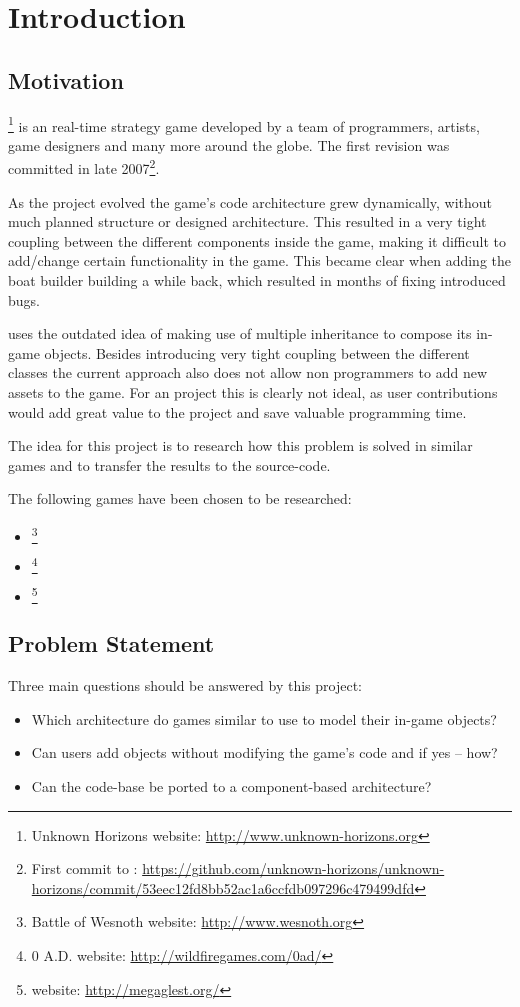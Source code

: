 

\section{Introduction}

\subsection{Motivation}
\UH{}\footnote{Unknown Horizons website: \url{http://www.unknown-horizons.org}} is an \OS{} real-time strategy game developed by a team of programmers, artists, game
designers and many more around the globe. The first revision was committed in late 2007\footnote{First commit to \UH{}:
\url{https://github.com/unknown-horizons/unknown-horizons/commit/53eec12fd8bb52ac1a6ccfdb097296c479499dfd}}.

As the project evolved the game's code architecture grew dynamically, without much planned structure or
designed architecture. This resulted in a very tight coupling between the different components inside the game, making
it difficult to add/change certain functionality in the game. This became clear when adding the boat builder building
a while back, which resulted in months of fixing introduced bugs.

\UH{} uses the outdated idea of making use of multiple inheritance to compose its in-game objects. Besides introducing
very tight coupling between the different classes the current approach also does not allow non programmers to add new
assets to the game. For an \OS{} project this is clearly not ideal, as user contributions would add great value to the
project and save valuable programming time.

The idea for this project is to research how this problem is solved in similar \OS{} games and to transfer the results to
the \UH{} source-code. 

The following games have been chosen to be researched:
\begin{itemize}
    \item \BOW{}\footnote{Battle of Wesnoth website: \url{http://www.wesnoth.org}}
    \item \AD{}\footnote{0 A.D. website: \url{http://wildfiregames.com/0ad/}}
    \item \GLEST{}\footnote{\GLEST{} website: \url{http://megaglest.org/}}
\end{itemize}

\subsection{Problem Statement}
Three main questions should be answered by this project:
\begin{itemize}
    \item Which architecture do \OS{} games similar to \UH{} use to model their in-game objects?
    \item Can users add objects without modifying the game's code and if yes -- how?
    \item Can the \UH{} code-base be ported to a component-based architecture?
\end{itemize}

